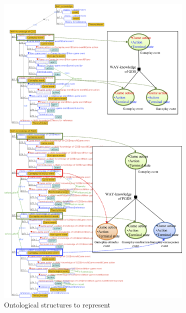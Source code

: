 \begin{figure}[!htb]
 \caption[Ontological structures to represent \emph{WAY-knowledge of PGDS}]{Ontological structures to represent }
 \label{fig:ontological-structures-way-knowledge-of-pgds}
 \centering
 \includegraphics[width=0.84\textwidth]{images/chap-ontogacles2/ontological-structures-way-knowledge-of-pgds.png}
 \fautor
\end{figure}
\newpage

